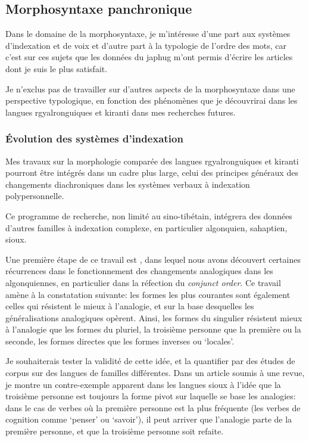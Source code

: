 \documentclass[oldfontcommands,oneside,a4paper,11pt]{article}
\begin{document}
 

\subsection{Morphosyntaxe panchronique}
Dans le domaine de la morphosyntaxe, je m'intéresse d'une part aux systèmes d'indexation et de voix et d'autre part à la typologie de l'ordre des mots, car c'est sur ces sujets que les données du japhug m'ont permis d'écrire les articles dont je suis le plus satisfait.

Je n'exclus pas de travailler sur d'autres aspects de la morphosyntaxe dans une perspective typologique, en fonction des phénomènes que je découvrirai  dans les langues rgyalronguiques et kiranti dans mes recherches futures.

\subsubsection{Évolution des systèmes d'indexation} \label{sec:indexation}
 Mes travaux sur la morphologie comparée des langues rgyalronguiques et kiranti pourront être intégrés dans un cadre plus large, celui des principes généraux des changements diachroniques dans les systèmes verbaux à indexation polypersonnelle.  
 
 Ce programme de recherche, non limité au sino-tibétain, intégrera des données d'autres familles à indexation complexe, en particulier algonquien, sahaptien, sioux. 

Une première étape de ce travail est \citet{jacques15directionality}, dans lequel nous avons découvert certaines récurrences dans le fonctionnement des changements analogiques dans les algonquiennes, en particulier dans la réfection du \textit{conjunct order}. Ce travail amène à la constatation suivante:  les formes les plus courantes sont également celles qui résistent le mieux à l'analogie, et sur la base desquelles les généralisations analogiques opèrent. Ainsi, les formes du singulier résistent mieux à l'analogie que les formes du pluriel, la troisième personne que la première ou la seconde, les formes directes que les formes inverses ou `locales'.

Je souhaiterais tester la validité de cette idée, et la quantifier par des études de corpus sur des langues de familles différentes. Dans un article soumis à une revue, je montre un contre-exemple apparent dans les langues sioux à l'idée que la troisième personne est toujours la forme pivot sur laquelle se base les analogies: dans le cas de verbes où la première personne est la plus fréquente (les verbes de cognition comme `penser' ou `savoir'), il peut arriver que l'analogie parte de la première personne, et que la troisième personne soit refaite.
 
\end{document}
